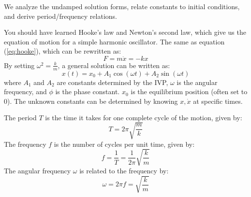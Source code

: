 \documentclass[11pt]{report}
\begin{document}
We analyze the undamped solution forms, relate constants to initial conditions, and derive period/frequency relations.
\begin{definition}
    You should have learned Hooke's law and Newton's second law, which give us the equation of motion for a simple harmonic oscillator. The same as equation (\ref{eq:hooke}), which can be rewritten as:
    $$
        F = m\ddot{x} = -kx
    $$
    By setting $\omega^2 = \frac{k}{m}$, a general solution can be written as:
    $$
        x(t) = x_0 + A_1 \cos(\omega t) + A_2 \sin(\omega t)
    $$
    where $A_1$ and $A_2$ are constants determined by the IVP, $\omega$ is the angular frequency, and $\phi$ is the phase constant. $x_0$ is the equilibrium position (often set to 0). The unknown constants can be determined by knowing $x, \dot{x}$ at specific times.
\end{definition}

\begin{definition}
    The period \( T \) is the time it takes for one complete cycle of the motion, given by:
    $$
        T = 2\pi \sqrt{\frac{m}{k}}
    $$
    The frequency \( f \) is the number of cycles per unit time, given by:
    $$
        f = \frac{1}{T} = \frac{1}{2\pi} \sqrt{\frac{k}{m}}
    $$
    The angular frequency \( \omega \) is related to the frequency by:
    $$
        \omega = 2\pi f = \sqrt{\frac{k}{m}}
    $$
    
\end{definition}
\end{document}
